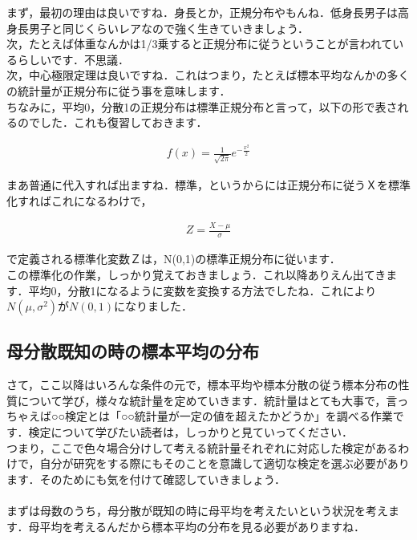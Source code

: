 \documentclass[11pt,a4paper,uplatex]{ujreport} 	%
\begin{document}
まず，最初の理由は良いですね．身長とか，正規分布やもんね．低身長男子は高身長男子と同じくらいレアなので強く生きていきましょう．\\

次，たとえば体重なんかは1/3乗すると正規分布に従うということが言われているらしいです．不思議．\\

次，中心極限定理は良いですね．これはつまり，たとえば標本平均なんかの多くの統計量が正規分布に従う事を意味します．
\\

ちなみに，平均0，分散1の正規分布は標準正規分布と言って，以下の形で表されるのでした．これも復習しておきます．

\begin{align}
  f(x) = \frac{1}{\sqrt{2\pi}}e^{-\frac{x^2}{2}}
\end{align}

まあ普通に代入すれば出ますね．標準，というからには正規分布に従うＸを標準化すればこれになるわけで，

\begin{align}
  Z = \frac{X-\mu}{\sigma}
\end{align}

で定義される標準化変数Ｚは，N(0,1)の標準正規分布に従います．\\

この標準化の作業，しっかり覚えておきましょう．これ以降ありえん出てきます．平均0，分散1になるように変数を変換する方法でしたね．これにより$N(\mu, \sigma^2)$が$N(0,1)$になりました．



\subsection{母分散既知の時の標本平均の分布}
さて，ここ以降はいろんな条件の元で，標本平均や標本分散の従う標本分布の性質について学び，様々な統計量を定めていきます．統計量はとても大事で，言っちゃえば○○検定とは「○○統計量が一定の値を超えたかどうか」を調べる作業です．検定について学びたい読者は，しっかりと見ていってください．\\

つまり，ここで色々場合分けして考える統計量それぞれに対応した検定があるわけで，自分が研究をする際にもそのことを意識して適切な検定を選ぶ必要があります．そのためにも気を付けて確認していきましょう．\\
\\

まずは母数のうち，母分散が既知の時に母平均を考えたいという状況を考えます．母平均を考えるんだから標本平均の分布を見る必要がありますね．\\
\end{document}
